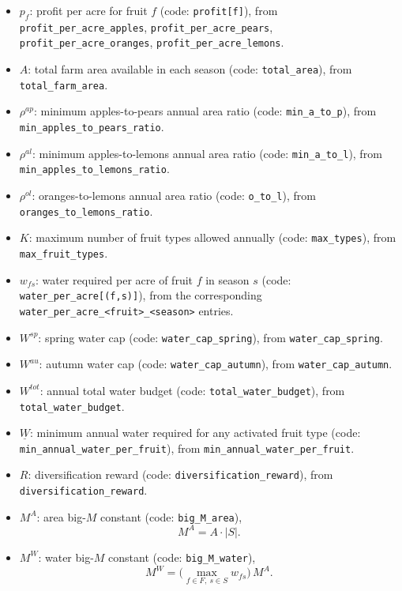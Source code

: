 \begin{itemize}
    \item $p_f$: profit per acre for fruit $f$ (code: \texttt{profit[f]}), from
    \texttt{profit\_per\_acre\_apples}, \texttt{profit\_per\_acre\_pears},
    \texttt{profit\_per\_acre\_oranges}, \texttt{profit\_per\_acre\_lemons}.
    \item $A$: total farm area available in each season (code: \texttt{total\_area}), from \texttt{total\_farm\_area}.
    \item $\rho^{ap}$: minimum apples-to-pears annual area ratio (code: \texttt{min\_a\_to\_p}), from \texttt{min\_apples\_to\_pears\_ratio}.
    \item $\rho^{al}$: minimum apples-to-lemons annual area ratio (code: \texttt{min\_a\_to\_l}), from \texttt{min\_apples\_to\_lemons\_ratio}.
    \item $\rho^{ol}$: oranges-to-lemons annual area ratio (code: \texttt{o\_to\_l}), from \texttt{oranges\_to\_lemons\_ratio}.
    \item $K$: maximum number of fruit types allowed annually (code: \texttt{max\_types}), from \texttt{max\_fruit\_types}.
    \item $w_{fs}$: water required per acre of fruit $f$ in season $s$ (code: \texttt{water\_per\_acre[(f,s)]}), from the corresponding \texttt{water\_per\_acre\_<fruit>\_<season>} entries.
    \item $W^{sp}$: spring water cap (code: \texttt{water\_cap\_spring}), from \texttt{water\_cap\_spring}.
    \item $W^{au}$: autumn water cap (code: \texttt{water\_cap\_autumn}), from \texttt{water\_cap\_autumn}.
    \item $W^{tot}$: annual total water budget (code: \texttt{total\_water\_budget}), from \texttt{total\_water\_budget}.
    \item $\underline{W}$: minimum annual water required for any activated fruit type (code: \texttt{min\_annual\_water\_per\_fruit}), from \texttt{min\_annual\_water\_per\_fruit}.
    \item $R$: diversification reward (code: \texttt{diversification\_reward}), from \texttt{diversification\_reward}.
    \item $M^A$: area big-$M$ constant (code: \texttt{big\_M\_area}),
    \[
    M^A = A\cdot |S|.
    \]
    \item $M^W$: water big-$M$ constant (code: \texttt{big\_M\_water}),
    \[
    M^W = \Big(\max_{f\in F,\ s\in S} w_{fs}\Big)\, M^A.
    \]
\end{itemize}

